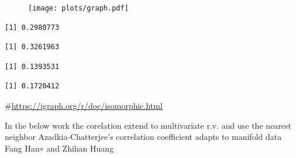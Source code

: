 \documentclass[
  10pt,
]{article}
\begin{document}
\begin{figure}
\texttt{[image: plots/graph.pdf]}
\end{figure}

\begin{verbatim}
[1] 0.2980773
\end{verbatim}

\begin{verbatim}
[1] 0.3261963
\end{verbatim}

\begin{verbatim}
[1] 0.1393531
\end{verbatim}

\begin{verbatim}
[1] 0.1720412
\end{verbatim}

\#\url{https://igraph.org/r/doc/isomorphic.html}

In the below work the corelation extend to multivariate r.v. and use the
nearest neighbor Azadkia-Chatterjee's correlation coefficient adapts to
manifold data Fang Han∗ and Zhihan Huang
\end{document}
